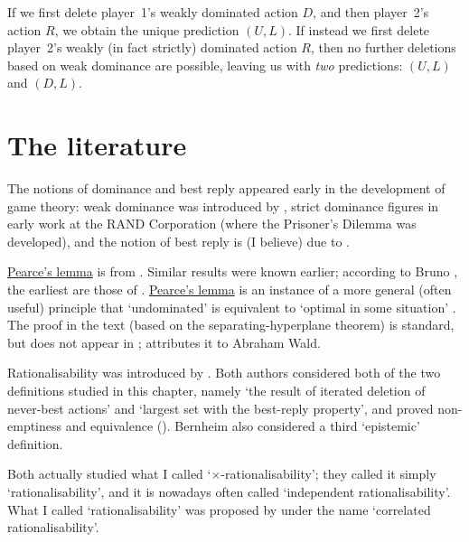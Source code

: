 \addtocounter{example}{-2}
\begin{example}[continued]
	\label{example:idwds_iterated}
	If we first delete player~1's weakly dominated action $D$, and then player~2's action $R$, we obtain the unique prediction $(U,L)$. If instead we first delete player~2's weakly (in fact strictly) dominated action $R$, then no further deletions based on weak dominance are possible, leaving us with \emph{two} predictions: $(U,L)$ and $(D,L)$.
\end{example}
\addtocounter{example}{1}



\section{The literature}
\label{dom:lit}

The notions of dominance and best reply appeared early in the development of game theory: weak dominance was introduced by \textcite{Borel1921}, strict dominance figures in early work at the RAND Corporation (where the Prisoner's Dilemma was developed), and the notion of best reply is (I believe) due to \textcite{Nash1950,Nash1951}.

\hyperref[lemma:pearce]{Pearce's lemma} is from \textcite[][Lemma~3]{Pearce1984}. Similar results were known earlier; according to Bruno \textcite{Salcedo2020}, the earliest are those of \textcite{Wald1939,Stein1955}. \hyperref[lemma:pearce]{Pearce's lemma} is an instance of a more general (often useful) principle that `undominated' is equivalent to `optimal in some situation' \parencite[see e.g.][]{Fishburn1975,BorgersCheng2023}. The proof in the text (based on the separating-hyperplane theorem) is standard, but does not appear in \textcite{Pearce1984}; \textcite{Salcedo2020} attributes it to Abraham Wald.

Rationalisability was introduced by \textcite{Bernheim1984,Pearce1984}. Both authors considered both of the two definitions studied in this chapter, namely `the result of iterated deletion of never-best actions' and `largest set with the best-reply property', and proved non-emptiness and equivalence (). Bernheim also considered a third `epistemic' definition.

Both \textcite{Bernheim1984,Pearce1984} actually studied what I called `$\times$-rationalisability'; they called it simply `rationalisability', and it is nowadays often called `independent rationalisability'. What I called `rationalisability' was proposed by \textcite{BrandenburgerDekel1987} under the name `correlated rationalisability'.

